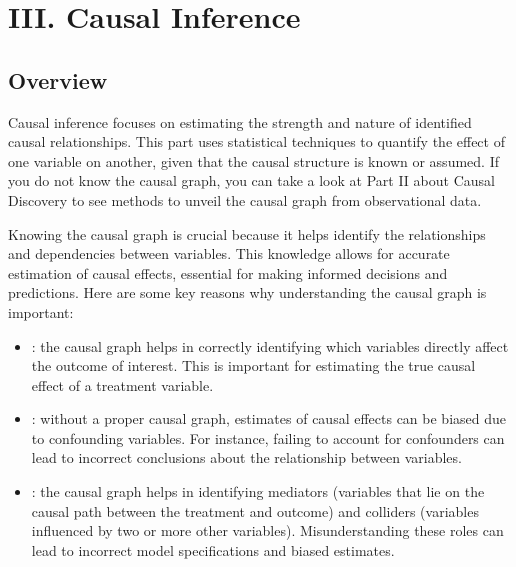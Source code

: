 \documentclass[letterpaper,10pt,english]{jupyterBook}
\begin{document}
\sphinxstepscope


\part{III. Causal Inference}

\sphinxstepscope


\chapter{Overview}
\label{\detokenize{notebooks/preface_causal_inference:overview}}\label{\detokenize{notebooks/preface_causal_inference::doc}}
\sphinxAtStartPar
Causal inference focuses on estimating the strength and nature of identified causal relationships. This part uses statistical techniques to quantify the effect of one variable on another, given that the causal structure is known or assumed. If you do not know the causal graph, you can take a look at Part II about Causal Discovery to see methods to unveil the causal graph from observational data.

\sphinxAtStartPar
Knowing the causal graph is crucial because it helps identify the relationships and dependencies between variables. This knowledge allows for accurate estimation of causal effects, essential for making informed decisions and predictions. Here are some key reasons why understanding the causal graph is important:
\begin{itemize}
\item {} 
\sphinxAtStartPar
{}: the causal graph helps in correctly identifying which variables directly affect the outcome of interest. This is important for estimating the true causal effect of a treatment variable.

\item {} 
\sphinxAtStartPar
{}: without a proper causal graph, estimates of causal effects can be biased due to confounding variables. For instance, failing to account for confounders can lead to incorrect conclusions about the relationship between variables.

\item {} 
\sphinxAtStartPar
{}: the causal graph helps in identifying mediators (variables that lie on the causal path between the treatment and outcome) and colliders (variables influenced by two or more other variables). Misunderstanding these roles can lead to incorrect model specifications and biased estimates.

\end{itemize}
\end{document}
